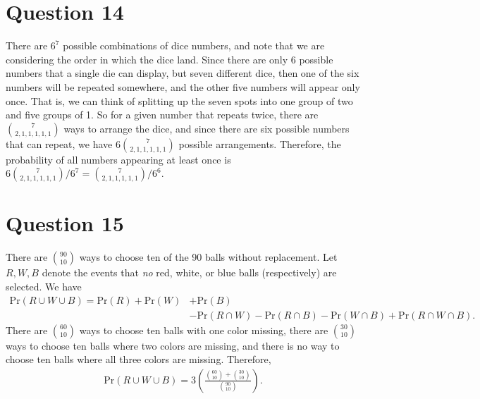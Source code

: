 \documentclass[10pt]{article}
\begin{document}
\section{Question 14} \noindent
There are \(6^7\) possible combinations of dice numbers, and note that we are considering the order in which the dice land. 
Since there are only 6 possible numbers that a single die can display, but seven different dice, then one of the six numbers 
will be repeated somewhere, and the other five numbers will appear only once. That is, we can think of splitting up the seven spots into one group of two and
five groups of 1. So for a given number that repeats twice, there are \(\binom{7}{2,1,1,1,1,1}\) ways to arrange the dice, and since there are six possible 
numbers that can repeat, we have \(6\binom{7}{2,1,1,1,1,1}\) possible arrangements. Therefore, the probability of all numbers appearing 
at least once is \(6\binom{7}{2,1,1,1,1,1} / 6^7 = \binom{7}{2,1,1,1,1,1} / 6^6\).

\section{Question 15} \noindent
There are \(\binom{90}{10}\) ways to choose ten of the 90 balls without replacement. Let \(R, W, B\) denote the events that \textit{no} red, white, or blue
balls (respectively) are selected. We have 
\begin{align*}
    \mathrm{Pr}(R \cup W \cup B) = \mathrm{Pr}(R) + \mathrm{Pr}(W) &+ \mathrm{Pr}(B) \\
    &- \mathrm{Pr}(R \cap W) - \mathrm{Pr}(R \cap B) - \mathrm{Pr}(W \cap B) 
    + \mathrm{Pr}(R \cap W \cap B). 
\end{align*}
There are \(\binom{60}{10}\) ways to choose ten balls with one color missing, there are \(\binom{30}{10}\) ways to choose ten balls where two colors are
missing, and there is no way to choose ten balls where all three colors are missing. Therefore, 
\begin{align*}
    \mathrm{Pr}(R \cup W \cup B) = 3 \left( \frac{\binom{60}{10} + \binom{30}{10}}{\binom{90}{10}} \right).
\end{align*}
\end{document}
